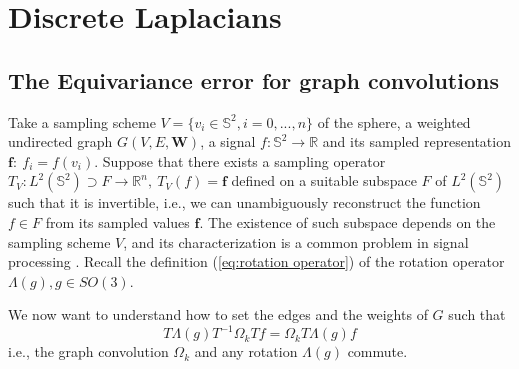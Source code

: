 
\section{Discrete Laplacians}\label{sec:Chapter3: other discrete laplacians}
\subsection{The Equivariance error for graph convolutions}
Take a sampling scheme $V=\{v_i\in\mathbb S^2, i=0, ..., n\}$ of the sphere, a weighted undirected graph $G(V, E, \mathbf W)$, a signal $f: \mathbb S^2\to\mathbb R$ and its sampled representation $\mathbf f:\ f_i=f(v_i)$. Suppose that there exists a sampling operator $T_V: L^2(\mathbb S^2) \supset F\to \mathbb R^n,\  T_V(f) = \mathbf f$ defined on a suitable subspace $F$ of $L^2(\mathbb S^2)$ such that it is invertible, i.e., we can unambiguously reconstruct the function $f\in F$ from its sampled values $\mathbf f$. The existence of such subspace depends on the sampling scheme $V$, and its characterization is a common problem in signal processing \cite{Driscoll:1994:CFT:184069.184073}. Recall the definition (\ref{eq:rotation operator}) of the rotation operator $\Lambda(g), g\in SO(3)$. 

We now want to understand how to set the edges and the weights of $G$ such that
\begin{equation}\label{eq:equivariance}
	T \Lambda(g) T^{-1} \Omega_k T f = \Omega_k T \Lambda(g) f
\end{equation}
i.e., the graph convolution $\Omega_k$ and any rotation $\Lambda(g)$ commute.
 
